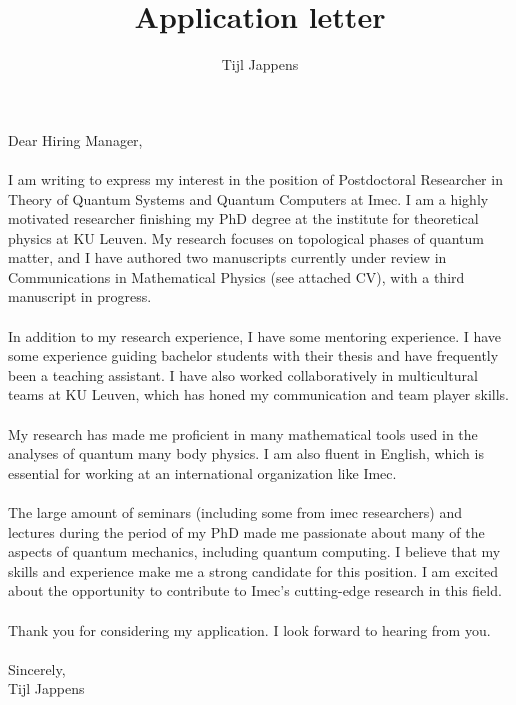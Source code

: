 \documentclass[11pt]{article}
\title{Application letter}
\author{Tijl Jappens}
\begin{document}
\maketitle
Dear Hiring Manager,\\\\
I am writing to express my interest in the position of Postdoctoral Researcher in Theory of Quantum Systems and Quantum Computers at Imec. I am a highly motivated researcher finishing my PhD degree at the institute for theoretical physics at KU Leuven. My research focuses on topological phases of quantum matter, and I have authored two manuscripts currently under review in Communications in Mathematical Physics (see attached CV), with a third manuscript in progress.\\\\
In addition to my research experience, I have some mentoring experience. I have some experience guiding bachelor students with their thesis and have frequently been a teaching assistant. I have also worked collaboratively in multicultural teams at KU Leuven, which has honed my communication and team player skills.\\\\
My research has made me proficient in many mathematical tools used in the analyses of quantum many body physics. I am also fluent in English, which is essential for working at an international organization like Imec.\\\\
The large amount of seminars (including some from imec researchers) and lectures during the period of my PhD made me passionate about many of the aspects of quantum mechanics, including quantum computing. I believe that my skills and experience make me a strong candidate for this position. I am excited about the opportunity to contribute to Imec's cutting-edge research in this field.\\\\
Thank you for considering my application. I look forward to hearing from you.\\\\
Sincerely,\\
Tijl Jappens
\end{document}
